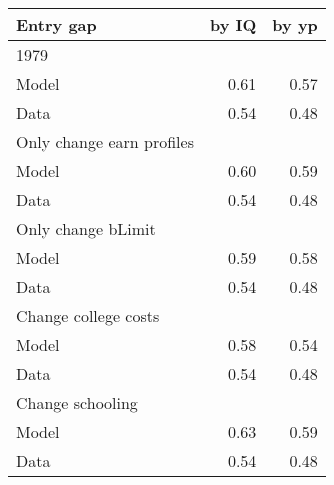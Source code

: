\begin{tabular}{lrr}
\hline
Entry gap & by IQ  & by yp  \\ 
\hline
1979 &   &   \\ 
Model & 0.61  & 0.57  \\ 
Data & 0.54  & 0.48  \\ 
Only change earn profiles &   &   \\ 
Model & 0.60  & 0.59  \\ 
Data & 0.54  & 0.48  \\ 
Only change bLimit &   &   \\ 
Model & 0.59  & 0.58  \\ 
Data & 0.54  & 0.48  \\ 
Change college costs &   &   \\ 
Model & 0.58  & 0.54  \\ 
Data & 0.54  & 0.48  \\ 
Change schooling &   &   \\ 
Model & 0.63  & 0.59  \\ 
Data & 0.54  & 0.48  \\ 
\hline
\end{tabular}%
